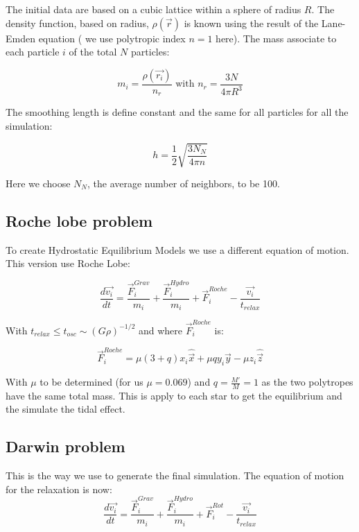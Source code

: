 \documentclass{article}
\begin{document}
The initial data are based on a cubic lattice within a sphere of radius $R$.
The density function, based on radius, $\rho(\vec{r})$ is known using the result of the Lane-Emden equation ( we use polytropic index $n = 1$ here).
The mass associate to each particle $i$ of the total $N$ particles:

$$ m_i = \frac{\rho(\vec{r_i})}{n_r} \mbox{ with } n_r = \frac{3N}{4 \pi R^3}$$

The smoothing length is define constant and the same for all particles for all the simulation:

$$ h = \frac{1}{2}\sqrt{\frac{3N_N}{4\pi n}} $$

Here we choose $N_N$, the average number of neighbors, to be 100.

\subsection{Roche lobe problem}

To create Hydrostatic Equilibrium Models we use a different equation of motion. This version use Roche Lobe:

\begin{equation}
\frac{d\vec{v_i}}{dt} = \frac{\vec{F}_i^{Grav}}{m_i} + \frac{\vec{F}_i^{Hydro}}{m_i} + \vec{F}_i^{Roche} - \frac{\vec{v_i}}{t_{relax}}
\end{equation}


With $t_{relax} \leq t_{osc} \sim (G\rho)^{-1/2}$ and
where $\vec{F}_i^{Roche}$ is:

$$\vec{F}_i^{Roche} = \mu (3+q) x_i \hat{\vec{x}} + \mu q y_i \hat{\vec{y}}-\mu z_i \hat{\vec{z}}$$

With $\mu$ to be determined (for us $\mu = 0.069$) and $q = \frac{M'}{M}=1$ as the two polytropes have the same total mass.
This is apply to each star to get the equilibrium and the simulate the tidal effect.

\subsection{Darwin problem}

This is the way we use to generate the final simulation.
The equation of motion for the relaxation is now:
\begin{equation}
\label{eq:darwin}
\frac{d\vec{v_i}}{dt} = \frac{\vec{F}_i^{Grav}}{m_i} +\frac{\vec{F}_i^{Hydro}}{m_i} + \vec{F}_i^{Rot} - \frac{\vec{v_i}}{t_{relax}}
\end{equation}
\end{document}
